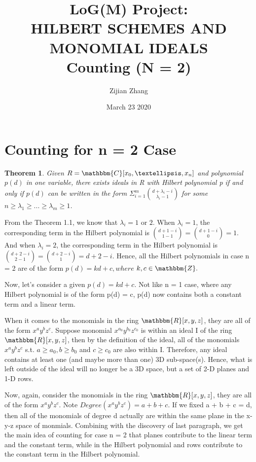 \documentclass[11pt]{amsart} %
\title{LoG(M) Project: \\ HILBERT SCHEMES AND MONOMIAL IDEALS \\ Counting (N = 2)}
\author{Zijian Zhang}
\date{March 23 2020}
\theoremstyle{plain} %
\newtheorem{theorem}{Theorem}[section]
\theoremstyle{definition} %
\begin{document}
\maketitle
\thispagestyle{plain}

\section{Counting for n = 2 Case}
\begin{theorem}
\text{[1]} Given \(R = \mathbbm{C}[x_0, …, x_n]\) and polynomial \(p(d)\) in one variable, there exists ideals in R with Hilbert polynomial p if and only if \(p(d)\) can be written in the form \(\Sigma^{m}_{i = 1} \binom{d + \lambda_i - i}{\lambda_i - 1}\) for some \(n \geqslant \lambda_1 \geqslant ... \geqslant \lambda_m \geqslant 1\).
\end{theorem}

From the Theorem 1.1, we know that \(\lambda_{i} = 1\) or \(2\). When \(\lambda_{i} = 1\), the corresponding term in the Hilbert polynomial is \(\binom{d + 1 - i}{1 - 1} = \binom{d + 1 - i}{0} = 1\). And when \(\lambda_{i} = 2\), the corresponding term in the Hilbert polynomial is \(\binom{d + 2 - i}{2 - 1} = \binom{d + 2 - i}{1} = d + 2 - i\). Hence, all the Hilbert polynomials in case n = 2 are of the form \(p(d) = kd + c, where \) \(k, c \in \mathbbm{Z}.\)

Now, let's consider a given \(p(d) = kd + c\). Not like n = 1 case, where any Hilbert polynomial is of the form p(d) = c, p(d) now contains both a constant term and a linear term.

When it comes to the monomials in the ring \(\mathbbm{R}[x, y, z]\), they are all of the form \(x^ay^bz^c\). Suppose monomial \(x^{a_0}y^{b_0}z^{c_0}\) is within an ideal I of the ring \(\mathbbm{R}[x, y, z]\), then by the definition of the ideal, all of the monomials \(x^ay^bz^c\) s.t. \(a \geqslant a_0, b \geqslant b_0\) and \(c \geqslant c_0\) are also within I. Therefore, any ideal contains at least one (and maybe more than one) 3D sub-space(s). Hence, what is left outside of the ideal will no longer be a 3D space, but a set of 2-D planes and 1-D rows.

Now, again, consider the monomials in the ring \(\mathbbm{R}[x, y, z]\), they are all of the form \(x^ay^bz^c\). Note \(Degree(x^ay^bz^c) = a + b + c\). If we fixed a + b + c = d, then all of the monomials of degree d actually are within the same plane in the x-y-z space of monmials. Combining with the discovery of last paragraph, we get the main idea of counting for case n = 2 that planes contribute to the linear term and the constant term, while in the Hilbert polynomial and rows contribute to the constant term in the Hilbert polynomial.
\end{document}
